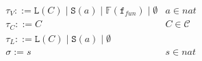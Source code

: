 \documentclass{article}
\begin{document}
\begin{figure}
    \begin{minipage}{0.55\textwidth}
\[\begin{aligned}
  & \tau_V ::= \mathtt{L}(C) \mid \mathtt{S}(a) \mid \mathbb{F}(\mathtt{f}_{fun}) \mid \emptyset & a \in \mathit{nat} \\
  & \tau_C ::= C & C \in \mathcal{C} \\
  & \tau_L ::= \mathtt{L}(C) \mid \mathtt{S}(a) \mid \emptyset \\
  & \sigma := s & s \in \mathit{nat} \\
  \end{aligned}\]
  \end{minipage}
  \begin{minipage}{0.4\textwidth}
    

\end{minipage}
\end{figure}
\end{document}
